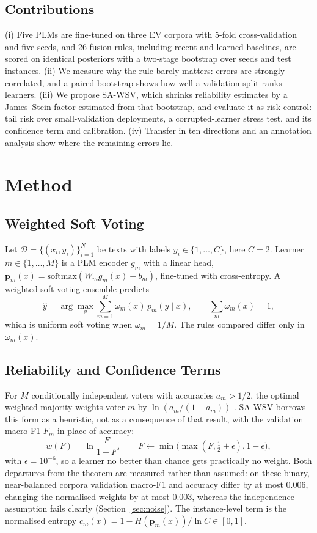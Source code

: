\documentclass[conference,a4paper]{IEEEtran}
\newcommand{\pr}{\mathbf{p}}
\newcommand{\rc}{SA\mbox{-}WSV}
\begin{document}
\subsection{Contributions}
(i) Five PLMs are fine-tuned on three EV corpora with 5-fold cross-validation and five seeds, and 26 fusion rules, including recent and learned baselines, are scored on identical posteriors with a two-stage bootstrap over seeds and test instances. (ii) We measure why the rule barely matters: errors are strongly correlated, and a paired bootstrap shows how well a validation split ranks learners. (iii) We propose \rc, which shrinks reliability estimates by a James--Stein factor estimated from that bootstrap, and evaluate it as risk control: tail risk over small-validation deployments, a corrupted-learner stress test, and its confidence term and calibration. (iv) Transfer in ten directions and an annotation analysis show where the remaining errors lie.

\section{Method}
\label{sec:method}

\subsection{Weighted Soft Voting}
Let $\mathcal{D}=\{(x_i,y_i)\}_{i=1}^{N}$ be texts with labels $y_i\in\{1,\dots,C\}$, here $C=2$. Learner $m\in\{1,\dots,M\}$ is a PLM encoder $g_m$ with a linear head, $\pr_m(x)=\mathrm{softmax}(W_m g_m(x)+b_m)$, fine-tuned with cross-entropy. A weighted soft-voting ensemble predicts
\begin{equation}
\hat{y}=\arg\max_{y}\sum_{m=1}^{M}\omega_m(x)\,p_m(y\mid x),\qquad \textstyle\sum_{m}\omega_m(x)=1,
\label{eq:wsv}
\end{equation}
which is uniform soft voting when $\omega_m=1/M$. The rules compared differ only in $\omega_m(x)$.

\subsection{Reliability and Confidence Terms}
For $M$ conditionally independent voters with accuracies $a_m>1/2$, the optimal weighted majority weights voter $m$ by $\ln(a_m/(1-a_m))$ \cite{kuncheva2014}. \rc{} borrows this form as a heuristic, not as a consequence of that result, with the validation macro-F1 $F_m$ in place of accuracy:
\begin{equation}
w(F)=\ln\frac{F}{1-F},\qquad F\leftarrow\min\big(\max(F,\tfrac12+\epsilon),1-\epsilon\big),
\label{eq:reliability}
\end{equation}
with $\epsilon=10^{-6}$, so a learner no better than chance gets practically no weight. Both departures from the theorem are measured rather than assumed: on these binary, near-balanced corpora validation macro-F1 and accuracy differ by at most 0.006, changing the normalised weights by at most 0.003, whereas the independence assumption fails clearly (Section~\ref{sec:noise}). The instance-level term is the normalised entropy $c_m(x)=1-H(\pr_m(x))/\ln C\in[0,1]$.
\end{document}

